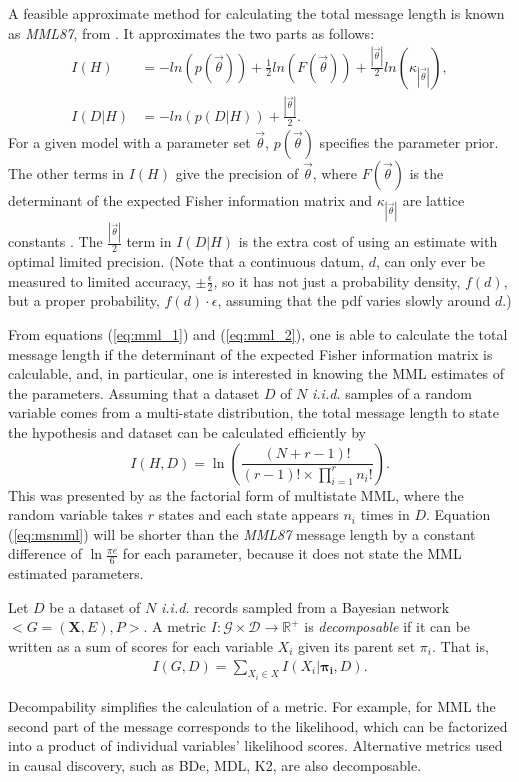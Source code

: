 \documentclass{svmult}
\begin{document}
A feasible approximate method for calculating the total message length
is known as \textit{MML87}, from \citet{wallace1987}. It approximates
the two parts as follows:
\begin{align}
\label{eq:mml_1}
I(H) &= -ln(p(\vec{\theta})) + \frac{1}{2} ln(F(\vec{\theta})) + \frac{|\vec{\theta}|}{2} ln(\kappa_{|\vec{\theta}|}), \\
\label{eq:mml_2}
I(D|H) &= -ln(p(D|H)) + \frac{|\vec{\theta}|}{2}.
\end{align}
For a given model with a parameter set $\vec{\theta}$,
$p(\vec{\theta})$ specifies the parameter prior. The other terms in
$I(H)$ give the precision of $\vec{\theta}$, where $F(\vec{\theta})$
is the determinant of the expected Fisher information matrix and
$\kappa_{|\vec{\theta}|}$ are lattice constants
\cite{wallace2005}. The $\frac{|\vec{\theta}|}{2}$ term in $I(D|H)$ is
the extra cost of using an estimate with optimal limited
precision. (Note that a continuous datum, $d$, can only ever be
measured to limited accuracy, $\pm \frac{\epsilon}{2}$, so it has not
just a probability density, $f(d)$, but a proper probability,
$f(d)\cdot \epsilon$, assuming that the pdf varies slowly around $d$.)

From equations (\ref{eq:mml_1}) and (\ref{eq:mml_2}), one is able to
calculate the total message length if the determinant of the expected
Fisher information matrix is calculable, and, in particular, one is
interested in knowing the MML estimates of the parameters.  Assuming
that a
dataset $D$ of $N$ \textit{i.i.d.} samples of a random variable comes
from a multi-state distribution, the total message length to state the
hypothesis and dataset can be calculated efficiently by
\begin{equation}
\label{eq:msmml}
I(H, D) = \ln \left(\frac{(N+r-1)!}{(r-1)!\times \prod_{i=1}^{r} n_i!} \right).
\end{equation}
This was presented by \citet{boulton1969information} as the factorial
form of multistate MML, where the random variable takes $r$ states and
each state appears $n_i$ times in $D$. Equation (\ref{eq:msmml}) will
be shorter than the \textit{MML87} message length by a constant
difference of $\ln\frac{\pi e}{6}$ for each parameter, because it does
not state the MML estimated parameters.

\begin{definition}[Decomposability]
\label{def:decomp}
Let $D$ be a dataset of $N$ \textit{i.i.d.} records sampled from a
Bayesian network $<G=(\mathbf{X},E), P>$. A metric
$I:\mathcal{G} \times \mathcal{D} \rightarrow \mathbb{R}^+$ is
\textit{decomposable} if it can be written as a sum of scores for each
variable $X_i$ given its parent set $\pi_i$. That is,
\begin{align*}
I(G, D) = \sum_{X_i \in X} I(X_i|\mathbf{\pi_i}, D).
\end{align*}

\end{definition}
Decompability simplifies the calculation of a metric. For example, for
MML the second part of the message corresponds to the likelihood,
which can be factorized into a product of individual variables'
likelihood scores. Alternative metrics used in causal discovery, such
as BDe, MDL, K2, are also decomposable.
\end{document}
